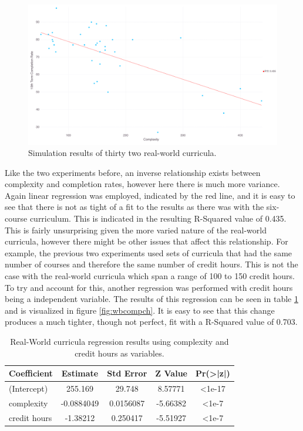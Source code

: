 \documentclass[botnum, fleqn]{unmeethesis}
\begin{document}
    \begin{figure}[h!]
      \centerline{\includegraphics[scale=0.25]{./figures/gradRate10_v_complexity_80.png}}
      \caption{Simulation results of thirty two real-world curricula.} 
      \label{fig:web10}
    \end{figure}

    Like the two experiments before, an inverse relationship exists between complexity and completion rates, however here there is much more variance. Again linear regression was employed, indicated by the red line, and it is easy to see that there is not as tight of a fit to the results as there was with the six-course curriculum. This is indicated in the resulting R-Squared value of 0.435. This is fairly unsurprising given the more varied nature of the real-world curricula, however there might be other issues that affect this relationship. For example, the previous two experiments used sets of curricula that had the same number of courses and therefore the same number of credit hours. This is not the case with the real-world curricula which span a range of 100 to 150 credit hours. To try and account for this, another regression was performed with credit hours being a independent variable. The results of this regression can be seen in table \ref{tab:webCH} and is visualized in figure \ref{fig:wbcompch}. It is easy to see that this change produces a much tighter, though not perfect, fit with a R-Squared value of 0.703.

    \begin{table}[!h]
      \centering
      \caption{Real-World curricula regression results using complexity and credit hours as variables.}
      \label{tab:webCH}
      \begin{tabular}{l*{4}{c}}
        Coefficient   & Estimate    & Std Error & Z Value   & Pr(>|z|)  \\
        \hline
        (Intercept)   & 255.169     & 29.748      & 8.57771   & <1e-17    \\
        complexity    & -0.0884049  &  0.0156087  & -5.66382  & <1e-7     \\
        credit hours  & -1.38212    &  0.250417   & -5.51927  & <1e-7     \\
      \end{tabular}
    \end{table}
\end{document}
